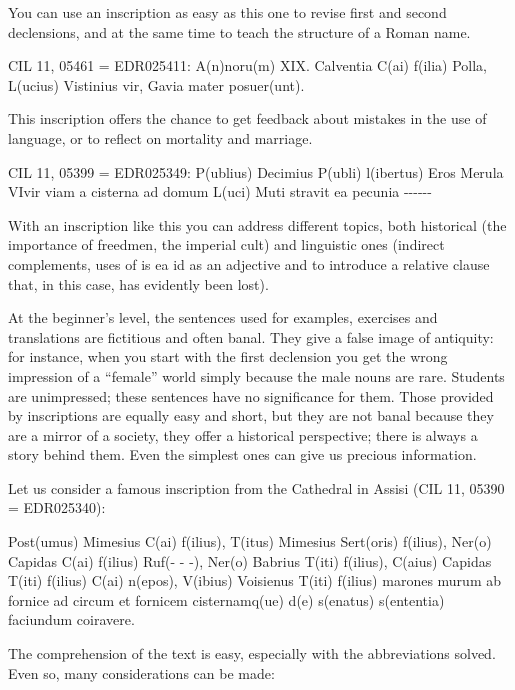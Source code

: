 \documentclass[amsthm,ebook]{saparticle}
\begin{document}
You can use an inscription as easy as this one to revise first and second declensions, and at the same time to teach the
structure of a Roman name.

\textwide{\FilledBigTriangleRight} CIL 11, 05461 = EDR025411: A(n)noru(m) XIX. Calventia C(ai) f(ilia) Polla, L(ucius)
Vistinius vir, Gavia mater posuer(unt). 

This inscription offers the chance to get feedback about mistakes in the use of language, or to reflect on mortality and
marriage.

\textwide{\FilledBigTriangleRight} CIL 11, 05399 = EDR025349: P(ublius) Decimius P(ubli) l(ibertus) Eros Merula VIvir
viam a cisterna ad domum L(uci) Muti stravit ea pecunia -{}-{}-{}-{}-{}- 

With an inscription like this you can address different topics, both historical (the importance of freedmen, the
imperial cult) and linguistic ones (indirect complements, uses of is ea id as an adjective and to introduce a relative
clause that, in this case, has evidently been lost).


\bigskip

At the beginner’s level, the sentences used for examples, exercises and translations are fictitious and often banal.
They give a false image of antiquity: for instance, when you start with the first declension you get the wrong
impression of a “female” world simply because the male nouns are rare. Students are unimpressed; these sentences have
no significance for them. Those provided by inscriptions are equally easy and short, but they are not banal because
they are a mirror of a society, they offer a historical perspective; there is always a story behind them. Even the
simplest ones can give us precious information.

Let us consider a famous inscription from the Cathedral in Assisi (CIL 11, 05390 = EDR025340):

Post(umus) Mimesius C(ai) f(ilius), T(itus) Mimesius Sert(oris) f(ilius), Ner(o) Capidas C(ai) f(ilius) Ruf(- - -),
Ner(o) Babrius T(iti) f(ilius), C(aius) Capidas T(iti) f(ilius) C(ai) n(epos), V(ibius) Voisienus T(iti) f(ilius)
marones murum ab fornice ad circum et fornicem cisternamq(ue) d(e) s(enatus) s(ententia) faciundum coiravere.

The comprehension of the text is easy, especially with the abbreviations solved. Even so, many considerations can be
made:
\end{document}
